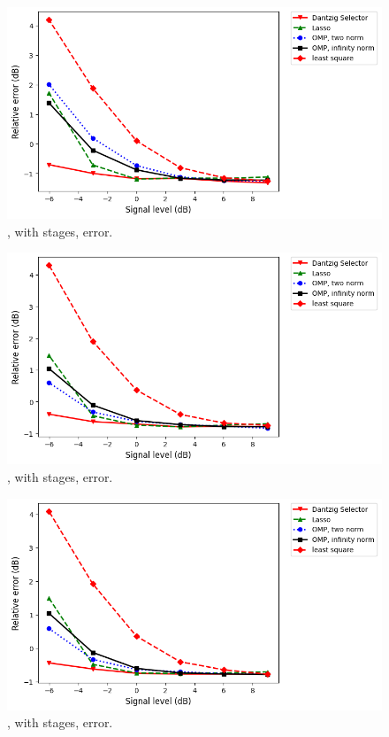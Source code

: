 \begin {figure} [H]
\includegraphics [width = \textwidth] {error-big-square-two.png}
\caption {, with  stages, error.}
\end {figure}

\begin {figure} [H]
\includegraphics [width = \textwidth] {error-big-tall-two.png}
\caption {, with  stages, error.}
\end {figure}

\begin {figure} [H]
\includegraphics [width = \textwidth] {error-big-wide-two.png}
\caption {, with  stages, error.}
\end {figure}

